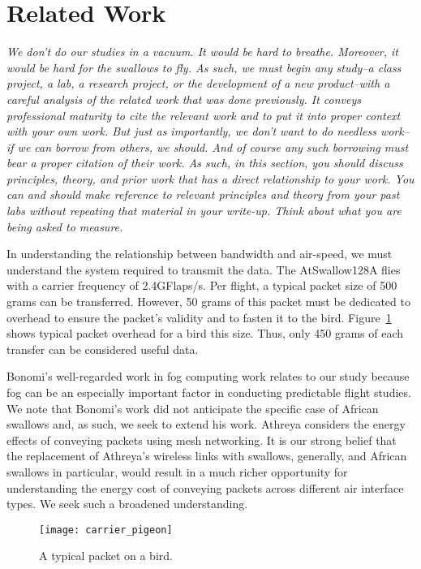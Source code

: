 \section{Related Work}
\label{sec:related}

\emph{We don't do our studies in a vacuum.  It would be hard to breathe.  Moreover, it would be hard for the swallows to fly.  As such, we must begin any study--a class project, a lab, a research project, or the development of a new product--with a careful analysis of the related work that was done previously.  It conveys professional maturity to cite the relevant work and to put it into proper context with your own work.  But just as importantly, we don't want to do needless work--if we can borrow from others, we should.  And of course any such borrowing must bear a proper citation of their work.  As such, in this section, you should discuss principles, theory, and prior work that has a direct relationship to your work. You can and should make reference to relevant principles and theory from your past labs without repeating that material in your write-up. Think about what you are being asked to measure.}

In understanding the relationship between bandwidth and air-speed, we must understand the system required to transmit the data. The AtSwallow128A flies with a carrier frequency of 2.4GFlaps/s. Per flight, a typical packet size of 500 grams can be transferred. However, 50 grams of this packet must be dedicated to overhead to ensure the packet's validity and to fasten it to the bird. Figure~\ref{fig:packet} shows typical packet overhead for a bird this size. Thus, only 450 grams of each transfer can be considered useful data.

Bonomi's well-regarded work in fog computing work \cite{Bonomi2012} relates to our study because fog can be an especially important factor in conducting predictable flight studies.  We note that Bonomi's work did not anticipate the specific case of African swallows and, as such, we seek to extend his work.  Athreya \cite{Athreya2014} considers the energy effects of conveying packets using mesh networking.  It is our strong belief that the replacement of Athreya's wireless links with swallows, generally, and African swallows in particular, would result in a much richer opportunity for understanding the energy cost of conveying packets across different air interface types.  We seek such a broadened understanding.

\begin{figure}[h]
\centering
\texttt{[image: carrier\_pigeon]}
\caption{A typical packet on a bird.}
\label{fig:packet}
\end{figure}

